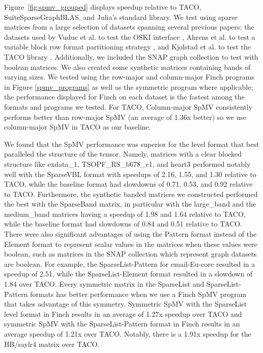   Figure~\ref{fig:spmv_grouped} displays speedup relative to TACO, SuiteSparseGraphBLAS, and Julia’s standard library.  We test using sparse matrices from a large selection of datasets spanning several previous papers: the datasets used by Vuduc et al. to test the OSKI interface \cite{vuduc2005oski}, Ahrens et al. to test a variable block row format partitioning strategy \cite{ahrens_optimal_2021}, and Kjolstad et al. to test the TACO library \cite{kjolstad_tensor_2017}. Additionally, we included the SNAP graph collection to test with boolean matrices. We also created some synthetic matrices containing bands of varying sizes.
  We tested using the row-major and column-major Finch programs in Figure \ref{spmv_programs} as well as the symmetric program where applicable; the performance displayed for Finch on each dataset is the fastest among the formats and programs we tested. For TACO, Column-major SpMV consistently performs better than row-major SpMV (an average of 1.36x better) so we use column-major SpMV in TACO as our baseline.
  
  We found that the SpMV performance was superior for the level format that best paralleled the structure of the tensor.
  Namely, matrices with a clear blocked structure like exdata\_1, TSOPF\_RS\_b678\_c1, and heart3 performed notably well with the SparseVBL format with speedups of 2.16, 1.55, and 1.30 relative to TACO, while the baseline format had slowdowns of 0.71, 0.53, and 0.92 relative to TACO.
  Furthermore, the synthetic banded matrices we constructed performed the best with the SparseBand matrix, in particular with the large\_band and the medium\_band matrices having a speedup of 1.98 and 1.64 relative to TACO, while the baseline format had slowdowns of 0.84 and 0.51 relative to TACO.
  There were also significant advantages of using the Pattern format instead of the Element format to represent scalar values in the matrices when these values were boolean, such as matrices in the SNAP collection which represent graph datasets are boolean. 
  For example, the SparseList-Pattern for email-Eu-core resulted in a speedup of 2.51, while the SparseList-Element format resulted in a slowdown of 1.84 over TACO.
  Every symmetric matrix in the SparseList and SparseList-Pattern formats has better performance when we use a Finch SpMV program that takes advantage of this symmetry.
  Symmetric SpMV with the SparseList level format in Finch results in an average of 1.27x speedup over TACO and symmetric SpMV with the SparseList-Pattern format in Finch results in an average speedup of 1.21x over TACO.
  Notably, there is a 1.91x speedup for the HB/saylr4 matrix over TACO. 
  
